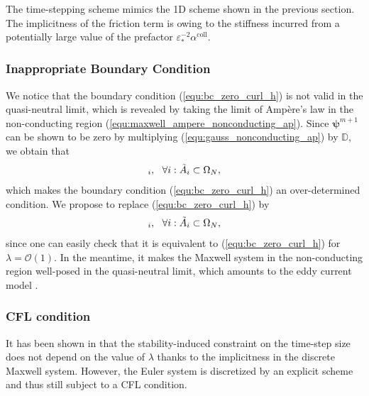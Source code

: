 \documentclass{article}
\begin{document}
The time-stepping scheme mimics the 1D scheme shown in the previous section. The implicitness of the friction term is owing to the stiffness incurred from a potentially large value of the prefactor $\varepsilon^{-2}_*\alpha^\text{coll}$.

\subsubsection{Inappropriate Boundary Condition}
We notice that the boundary condition (\ref{equ:bc_zero_curl_h}) is not valid in the quasi-neutral limit, which is revealed by taking the limit of Amp\`{e}re's law in the non-conducting region (\ref{equ:maxwell_ampere_nonconducting_ap}). Since $\bm{\psi}^{m+1}$ can be shown to be zero by multiplying (\ref{equ:gauss_nonconducting_ap}) by $\mathbb{D}$, we obtain that
\begin{equation*}
    [\Tilde{\mathbb{C}}\mathbf{h}^{m+1} = 0]_i, \ \ \forall i : \Tilde{A}_i \subset \Omega_N,
\end{equation*}
which makes the boundary condition (\ref{equ:bc_zero_curl_h}) an over-determined condition. We propose to replace (\ref{equ:bc_zero_curl_h}) by 
\begin{equation*}
    [\mathbf{d}^{m+1} = 0]_i, \ \ \forall i : \Tilde{A}_i \subset \Omega_N,
\end{equation*}
since one can easily check that it is equivalent to (\ref{equ:bc_zero_curl_h}) for $\lambda = \mathcal{O}(1)$. In the meantime, it makes the Maxwell system in the non-conducting region well-posed in the quasi-neutral limit, which amounts to the eddy current model \cite{alfredo_2003}. 

\subsubsection{CFL condition}
It has been shown in \cite{degond_2012} that the stability-induced constraint on the time-step size does not depend on the value of $\lambda$ thanks to the implicitness in the discrete Maxwell system. However, the Euler system is discretized by an explicit scheme and thus still subject to a CFL condition.
\end{document}

